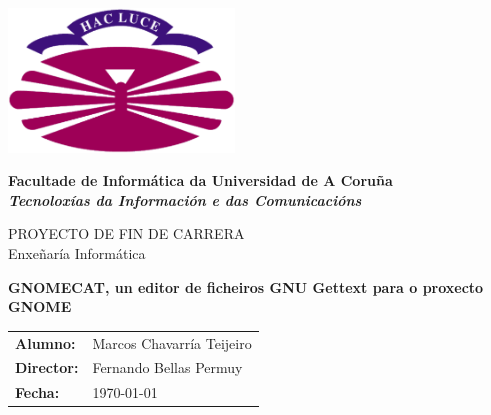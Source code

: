 %
%

%

\begin{titlepage}

	\begin{center}

		\includegraphics[width=6cm]{./eps/logo_udc.eps}
		\vspace{2cm}

		{\Large{\textbf{Facultade de Informática da Universidad de A Coruña}}}
		\\
		{\it \large{\textbf{Tecnoloxías da Información e das Comunicacións}}}
		\vspace{1cm}

		{\large PROYECTO DE FIN DE CARRERA\\Enxeñaría Informática}
		\vspace{1cm}

		\textbf{\Large GNOMECAT, un editor de ficheiros GNU Gettext para o proxecto GNOME}
		\vspace{7cm}
	\end{center}

	\begin{flushright}
		\begin{tabular}{ll}
			\large{\textbf{Alumno:}}	&
			\large{Marcos Chavarría Teijeiro} \\

			\large{\textbf{Director:}}	&
			\large{Fernando Bellas Permuy} \\

			\large{\textbf{Fecha:}}	&
			\large{\today} \\
		\end{tabular}
	\end{flushright}

\end{titlepage}
